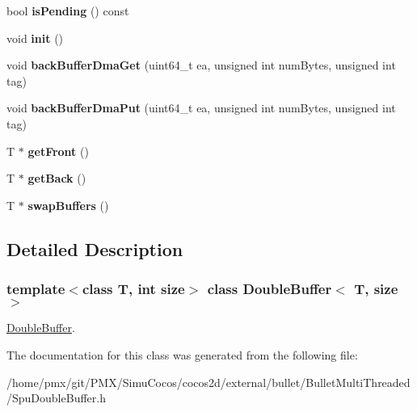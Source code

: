 \begin{DoxyCompactItemize}
bool {\bfseries is\+Pending} () const
\item 
\mbox{\label{classDoubleBuffer_a2e55ca9c30cc6e8520ddf00d703da8e9}} 
void {\bfseries init} ()
\item 
\mbox{\label{classDoubleBuffer_a85edf900d1585b1454e4759239dcd487}} 
void {\bfseries back\+Buffer\+Dma\+Get} (uint64\+\_\+t ea, unsigned int num\+Bytes, unsigned int tag)
\item 
\mbox{\label{classDoubleBuffer_a44bd5f04a1167e7940f06a0886267cbc}} 
void {\bfseries back\+Buffer\+Dma\+Put} (uint64\+\_\+t ea, unsigned int num\+Bytes, unsigned int tag)
\item 
\mbox{\label{classDoubleBuffer_a7c1c8b66099f9037495bd3016aa4e8da}} 
T $\ast$ {\bfseries get\+Front} ()
\item 
\mbox{\label{classDoubleBuffer_a30de43ad008b82026ae5514a0b0da302}} 
T $\ast$ {\bfseries get\+Back} ()
\item 
\mbox{\label{classDoubleBuffer_a890cd375bea7367e5187177d8308429a}} 
T $\ast$ {\bfseries swap\+Buffers} ()
\end{DoxyCompactItemize}


\subsection{Detailed Description}
\subsubsection*{template$<$class T, int size$>$\newline
class Double\+Buffer$<$ T, size $>$}

\hyperlink{classDoubleBuffer}{Double\+Buffer}. 

The documentation for this class was generated from the following file\+:\begin{DoxyCompactItemize}
\item 
/home/pmx/git/\+P\+M\+X/\+Simu\+Cocos/cocos2d/external/bullet/\+Bullet\+Multi\+Threaded/Spu\+Double\+Buffer.\+h\end{DoxyCompactItemize}
